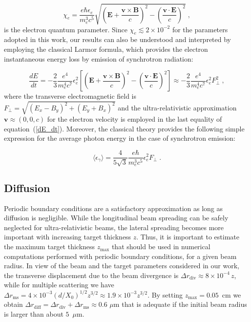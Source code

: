 \documentclass[fleqn,11pt]{wlscirep}
\begin{document}
\begin{equation}\label{chi_def}
\chi_e=\frac{e\hbar \epsilon_e}{m_e^3c^5}\sqrt{\left(\boldsymbol{E}+\frac{\boldsymbol{v}\times\boldsymbol{B}}{c}\right)^2
-\left(\frac{\boldsymbol{v}\cdot\boldsymbol{E}}{c}\right)^2}\;,
\end{equation}
is the electron quantum parameter. 
Since $\chi_e\lesssim 2\times10^{-2}$ for the parameters adopted in this work, our results can also be understood and interpreted by employing the classical Larmor formula, which provides the electron instantaneous energy loss by emission of synchrotron radiation:

\begin{equation}\label{dE_dt}
\frac{dE}{dt}
=-\frac{2}{3}\frac{e^4}{m_e^4c^7}\epsilon_e^2
\left[\left(\boldsymbol{E}+\frac{\boldsymbol{v}\times\boldsymbol{B}}{c}\right)^2
-\left(\frac{\boldsymbol{v}\cdot\boldsymbol{E}}{c}\right)^2\right]
\approx-\frac{2}{3}\frac{e^4}{m_e^4c^7}\epsilon_e^2F_\perp^2
\;,
\end{equation}
where the transverse electromagnetic field is $F_\perp=\sqrt{(E_x-B_y)^2+(E_y+B_x)^2}$ and the ultra-relativistic approximation $\boldsymbol{v}\approx(0,0,c)$ for the electron velocity is employed in the last equality of equation~(\ref{dE_dt}). Moreover, the classical theory provides the following simple expression for the average photon energy in the case of synchrotron emission\cite{Jackson}:

\begin{equation}\label{ave_photon_ene}
\langle \epsilon_\gamma\rangle=
\frac{4}{5\sqrt{3}}\frac{e\hbar}{m_e^3c^5}\epsilon_e^2F_\perp\;.
\end{equation}


\subsection*{Diffusion}

Periodic boundary conditions are a satisfactory approximation as long as diffusion is negligible. 
While the longitudinal beam spreading can be safely neglected for ultra-relativistic beams, the lateral spreading becomes more important with increasing target thickness $z$. 
Thus, it is important to estimate the maximum target thickness $z_\text{max}$ that should be used in numerical computations performed with periodic boundary conditions, for a given beam radius. 
In view of the beam and the target parameters considered in our work, the transverse displacement due to the beam divergence is $\Delta r_{\text{div}}\approx8\times10^{-4}\,z$, while for multiple scattering\cite{Olive:2016xmw} we have $\Delta r_{\text{ms}}=4\times10^{-3}(d/X_0)^{1/2}z^{3/2}\approx1.9\times10^{-3}z^{3/2}$.
By setting $z_\text{max}=0.05$~cm we obtain $\Delta r_\text{diff}=\Delta r_{\text{div}}+\Delta r_{\text{ms}}\approx0.6$ $\mu$m that is adequate if the initial beam radius is larger than about $5$~$\mu$m.
\end{document}
